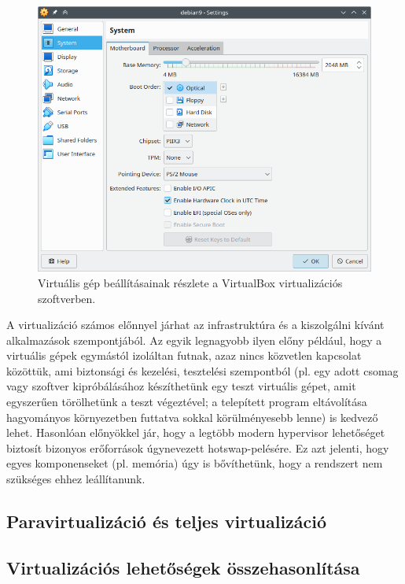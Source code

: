 \begin{figure}[!ht]
	\centering
	\includegraphics[width=120mm, keepaspectratio]{figures/virtualbox-vm-settings.png}
	\caption{Virtuális gép beállításainak részlete a VirtualBox virtualizációs szoftverben.}
	\label{fig:vboxsettings}
\end{figure}


A virtualizáció számos előnnyel járhat az infrastruktúra és a kiszolgálni kívánt alkalmazások szempontjából. Az egyik legnagyobb ilyen előny például, hogy a virtuális gépek egymástól izoláltan futnak, azaz nincs közvetlen kapcsolat közöttük, ami biztonsági és kezelési, tesztelési szempontból (pl. egy adott csomag vagy szoftver kipróbálásához készíthetünk egy teszt virtuális gépet, amit egyszerűen törölhetünk a teszt végeztével; a telepített program eltávolítása hagyományos környezetben futtatva sokkal körülményesebb lenne) is kedvező lehet. Hasonlóan előnyökkel jár, hogy a legtöbb modern \gls{hypervisor} lehetőséget biztosít bizonyos erőforrások úgynevezett \gls{hotswap}-pelésére. Ez azt jelenti, hogy egyes komponenseket (pl. memória) úgy is bővíthetünk, hogy a rendszert nem szükséges ehhez leállítanunk.

\subsection{Paravirtualizáció és teljes virtualizáció}

\subsection{Virtualizációs lehetőségek összehasonlítása} \label{sect:hypervisor-comparision}

